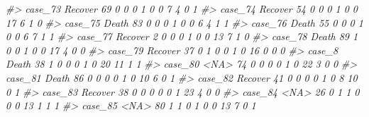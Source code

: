 \documentclass[]{book}
\newenvironment{Shaded}{\begin{snugshade}}{\end{snugshade}}
\newcommand{\CommentTok}[1]{\textcolor[rgb]{0.56,0.35,0.01}{\textit{#1}}}
\begin{document}
\begin{Shaded}
\begin{Highlighting}[]
\CommentTok{#> case_73  Recover  69        0        0                0                 1                 0              0                     7                      4           0             1}
\CommentTok{#> case_74  Recover  54        0        0                0                 1                 0              0                    17                      6           1             0}
\CommentTok{#> case_75    Death  83        0        0                0                 1                 0              0                     6                      4           1             1}
\CommentTok{#> case_76    Death  55        0        0                0                 1                 0              0                     6                      7           1             1}
\CommentTok{#> case_77  Recover   2        0        0                0                 1                 0              0                    13                      7           1             0}
\CommentTok{#> case_78    Death  89        1        0                0                 1                 0              0                    17                      4           0             0}
\CommentTok{#> case_79  Recover  37        0        1                0                 0                 1              0                    16                      0           0             0}
\CommentTok{#> case_8     Death  38        1        0                0                 0                 1              0                    20                     11           1             1}
\CommentTok{#> case_80     <NA>  74        0        0                0                 0                 1              0                    22                      3           0             0}
\CommentTok{#> case_81    Death  86        0        0                0                 0                 1              0                    10                      6           0             1}
\CommentTok{#> case_82  Recover  41        0        0                0                 0                 1              0                     8                     10           0             1}
\CommentTok{#> case_83  Recover  38        0        0                0                 0                 0              1                    23                      4           0             0}
\CommentTok{#> case_84     <NA>  26        0        1                1                 0                 0              0                    13                      1           1             1}
\CommentTok{#> case_85     <NA>  80        1        1                0                 1                 0              0                    13                      7           0             1}

\end{Highlighting}
\end{Shaded}
\end{document}
